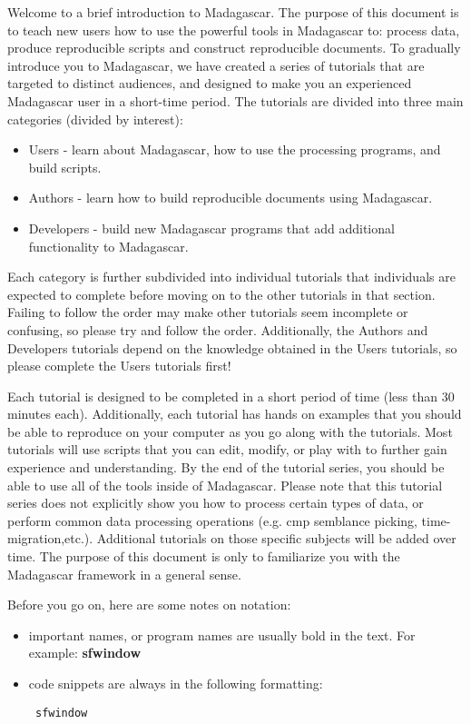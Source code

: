 Welcome to a brief introduction to Madagascar.  The purpose of this document is to teach new users how to use the powerful tools in Madagascar to: process data, produce reproducible scripts and construct reproducible documents.  
To gradually introduce you to Madagascar, we have created a series of tutorials that are targeted to distinct audiences, and designed to make you an experienced Madagascar user in a short-time period.  The tutorials are divided into three main categories (divided by interest):
\begin{itemize}
    \item Users - learn about Madagascar, how to use the processing programs, and build scripts.
    \item Authors - learn how to build reproducible documents using Madagascar.
    \item Developers - build new Madagascar programs that add additional functionality to Madagascar.
\end{itemize}
Each category is further subdivided into individual tutorials that individuals are expected to complete before moving on to the other tutorials in that section.  Failing to follow the order may make other tutorials seem incomplete or confusing, so please try and follow the order.  Additionally, the Authors and Developers tutorials depend on the knowledge obtained in the Users tutorials, so please complete the Users tutorials first!

Each tutorial is designed to be completed in a short period of time (less than 30 minutes each).  Additionally, each tutorial has hands on examples that you should be able to reproduce on your computer as you go along with the tutorials.  Most tutorials will use scripts that you can edit, modify, or play with to further gain experience and understanding.  By the end of the tutorial series, you should be able to use all of the tools inside of Madagascar.  Please note that this tutorial series does not explicitly show you how to process certain types of data, or perform common data processing operations (e.g. cmp semblance picking, time-migration,etc.).  Additional tutorials on those specific subjects will be added over time.  The purpose of this document is only to familiarize you with the Madagascar framework in a general sense.

Before you go on, here are some notes on notation:
\begin{itemize}
    \item important names, or program names are usually bold in the text.  For example: \textbf{sfwindow}
    \item code snippets are always in the following formatting: \begin{verbatim} sfwindow \end{verbatim}
\end{itemize}
